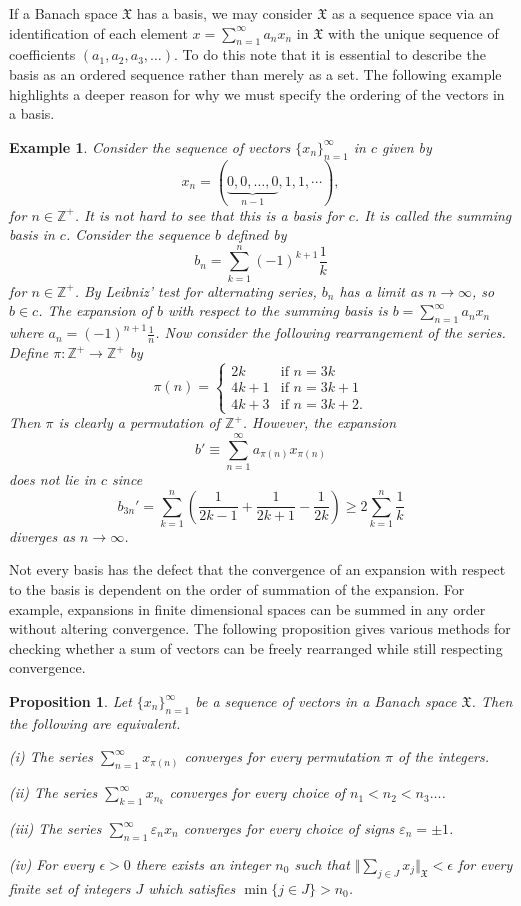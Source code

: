 \documentclass[mstat,12pt]{unswthesis}  %
\newcommand{\Z}{\mathbb{Z}}
\newcommand{\X}{\mathfrak{X}}
\def\ssnorm#1{\Vert #1 \Vert}
\newtheorem{proposition}[theorem]{Proposition}
\newtheorem{example}[theorem]{Example}
\numberwithin{equation}{section}
\begin{document}
If a Banach space $\X$ has a basis, we may consider $\X$ as a sequence
space via an identification of each element $x=\sum_{n=1}^{\infty}a_nx_n$ in
$\X$ with the unique sequence of coefficients $(a_1,a_2,a_3,\ldots)$. To do this
note that it is essential to describe the basis as an ordered sequence rather
than merely as a set. The following example highlights a deeper reason for
why we must specify the ordering of the vectors in a basis.

\begin{example}\label{summing basis}
Consider the sequence of vectors $\{x_n\}_{n=1}^{\infty}$ in $c$ given by
\[x_n=(\underbrace{0,0,\ldots,0}_{n-1},1,1,\cdots),\]
for $n\in\Z^+$. It is not hard to see that this is a basis for $c$.
It is called the {\em summing basis} in $c$.
Consider the sequence $b$ defined by
\[b_n=\sum_{k=1}^n(-1)^{k+1}\frac{1}{k}\]
for $n\in\Z^+$. By Leibniz' test for alternating series,
$b_n$ has a limit as $n\rightarrow\infty$, so $b\in c$. The expansion of $b$ 
with
respect to the summing basis is $b=\sum_{n=1}^{\infty}a_nx_n$ where
$a_n=(-1)^{n+1}\frac{1}{n}$. Now consider the following rearrangement of the
series. Define $\pi:\Z^+\rightarrow\Z^+$ by
\[\pi(n)=\left\{\begin{array}{ll}
				2k & \mbox{if $n=3k$}\\
				4k+1 & \mbox{if $n=3k+1$}\\
				4k+3 & \mbox{if $n=3k+2$.}
			\end{array}\right.
\]
Then $\pi$ is clearly a permutation of $\Z^+$. However, the expansion
\[b'\equiv\sum_{n=1}^{\infty}a_{\pi(n)}x_{\pi(n)}\]
does not lie in $c$ since
\[b_{3n}'=\sum_{k=1}^n\left(\frac{1}{2k-1}+\frac{1}{2k+1}-\frac{1}{2k}\right)
\geq 2\sum_{k=1}^n\frac{1}{k}\]
diverges as $n\rightarrow\infty$.
\end{example}

Not every basis has the defect that the convergence of an expansion with respect
to the basis is dependent on the order of summation of the expansion. For
example, expansions in finite dimensional spaces can be summed in any order
without altering convergence. The following proposition gives various methods 
for
checking whether a sum of vectors can be freely rearranged while still
respecting convergence.

\begin{proposition}\label{unconditional conv}
\cite[Proposition 1.c.1]{Lind}
Let $\{x_n\}_{n=1}^{\infty}$ be a sequence of vectors in a Banach space $\X$.
Then the following are equivalent.

(i) The series $\sum_{n=1}^{\infty}x_{\pi(n)}$ converges for every permutation
$\pi$ of the integers.

(ii) The series $\sum_{k=1}^{\infty}x_{n_k}$ converges for every choice of
$n_1<n_2<n_3\ldots$.

(iii) The series $\sum_{n=1}^{\infty}\varepsilon_nx_n$ converges
for every choice of signs $\varepsilon_n=\pm 1$.

(iv) For every $\epsilon>0$ there exists an integer $n_0$ such that
$\ssnorm{\sum_{j\in J}x_j}_{\X}<\epsilon$ for every finite set of integers $J$
which satisfies $\min\{j\in J\}>n_0$.
\end{proposition}
\end{document}

